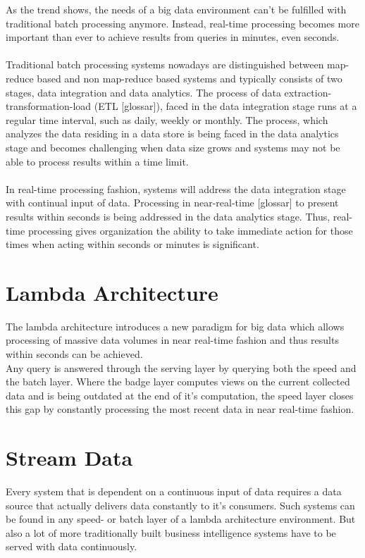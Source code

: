 As the trend shows, the needs of a big data environment can't be fulfilled with 
traditional batch processing anymore. Instead, real-time processing becomes more 
important than ever to achieve results from queries in minutes, even seconds. 
\cite{bange2013big}
\\ \\
Traditional batch processing systems nowadays are distinguished between
map-reduce based and non map-reduce based systems and typically consists of two
stages, data integration and data analytics. The process of data
extraction-transformation-load (ETL  [glossar]), faced in the data integration stage runs
at a regular time interval, such as daily, weekly or monthly. The process, which
analyzes the data residing in a data store is being faced in the data analytics
stage and becomes challenging when data size grows and systems may not be able
to process results within a time limit.\cite{Liu:2014:SRP:2628194.2628251}
\\ \\
In real-time processing fashion, systems will address the data integration stage
with continual input of data. Processing in near-real-time [glossar] to present 
results within seconds is being addressed in the data analytics stage. Thus,
real-time processing gives organization the ability to take immediate action
for those times when acting within seconds or minutes is significant.
\cite{PrpSvyOfDSPS}

\section{Lambda Architecture}
The lambda architecture introduces a new paradigm for big data which allows
processing of massive data volumes in near real-time fashion and thus results within
seconds can be achieved. 
\\
Any query is answered through the serving layer by querying 
both the speed and the batch layer. Where the badge layer computes views on the current collected data and
is being outdated at the end of it's computation, the speed layer closes this 
gap by constantly processing the most recent data in near real-time fashion. 
\cite{marz2015big} \cite{PrpSvyOfDSPS}

\section{Stream Data}
Every system that is dependent on a continuous input of data requires a data
source that actually delivers data constantly to it's consumers. Such systems
can be found in any speed- or batch layer of a lambda architecture environment. 
But also a lot of more traditionally built business intelligence systems have to be
served with data continuously.

